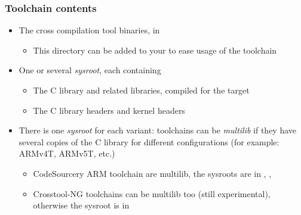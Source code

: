 \begin{frame}
  \frametitle{Toolchain contents}
  \begin{itemize}
  \item The cross compilation tool binaries, in 
    \begin{itemize}
    \item This directory can be added to your  to ease
      usage of the toolchain
    \end{itemize}
  \item One or several {\em sysroot}, each containing
    \begin{itemize}
    \item The C library and related libraries, compiled for the target
    \item The C library headers and kernel headers
    \end{itemize}
  \item There is one {\em sysroot} for each variant: toolchains can be
    {\em multilib} if they have several copies of the C library for
    different configurations (for example: ARMv4T, ARMv5T, etc.)
    \begin{itemize}
    \item CodeSourcery ARM toolchain are multilib, the sysroots are in
      ,
      ,
    \item Crosstool-NG toolchains can be multilib too (still
          experimental), otherwise the sysroot is
      in 
    \end{itemize}
  \end{itemize}
\end{frame}
